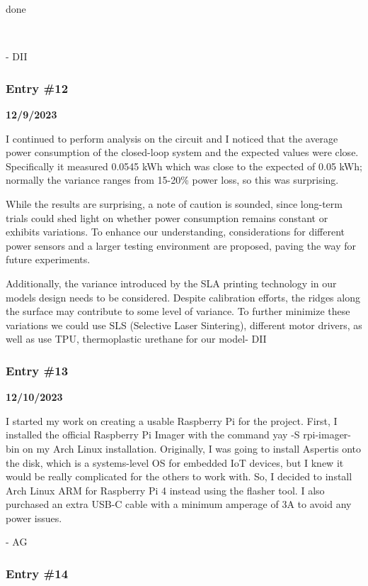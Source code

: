 done



- DII

\subsubsection{Entry \#12}\label{entry-12}

\textbf{12/9/2023}

I continued to perform analysis on the circuit and I noticed that the
average power consumption of the closed-loop system and the expected
values were close. Specifically it measured 0.0545 kWh which was close
to the expected of 0.05 kWh; normally the variance ranges from 15-20\%
power loss, so this was surprising.

While the results are surprising, a note of caution is sounded, since
long-term trials could shed light on whether power consumption remains
constant or exhibits variations. To enhance our understanding,
considerations for different power sensors and a larger testing
environment are proposed, paving the way for future experiments.

Additionally, the variance introduced by the SLA printing technology in
our model\textquotesingle s design needs to be considered. Despite
calibration efforts, the ridges along the surface may contribute to some
level of variance. To further minimize these variations we could use SLS
(Selective Laser Sintering), different motor drivers, as well as use
TPU, thermoplastic urethane for our model- DII

\subsubsection{Entry \#13}\label{entry-13}

\textbf{12/10/2023}

I started my work on creating a usable Raspberry Pi for the project.
First, I installed the official Raspberry Pi Imager with the command yay
-S rpi-imager-bin on my Arch Linux installation. Originally, I was going
to install Aspertis onto the disk, which is a systems-level OS for
embedded IoT devices, but I knew it would be really complicated for the
others to work with. So, I decided to install Arch Linux ARM for
Raspberry Pi 4 instead using the flasher tool. I also purchased an extra
USB-C cable with a minimum amperage of 3A to avoid any power issues.

- AG

\subsubsection{Entry \#14}\label{entry-14}

